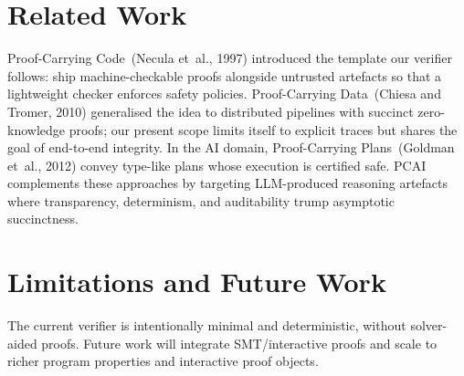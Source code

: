 \documentclass[11pt]{article}
\begin{document}
\section{Related Work}
Proof-Carrying Code~(Necula et~al., 1997) introduced the template our verifier follows: ship machine-checkable proofs alongside untrusted artefacts so that a lightweight checker enforces safety policies. Proof-Carrying Data~(Chiesa and Tromer, 2010) generalised the idea to distributed pipelines with succinct zero-knowledge proofs; our present scope limits itself to explicit traces but shares the goal of end-to-end integrity. In the AI domain, Proof-Carrying Plans~(Goldman et~al., 2012) convey type-like plans whose execution is certified safe. PCAI complements these approaches by targeting LLM-produced reasoning artefacts where transparency, determinism, and auditability trump asymptotic succinctness.

\section{Limitations and Future Work}
The current verifier is intentionally minimal and deterministic, without solver-aided proofs. Future work will integrate SMT/interactive proofs and scale to richer program properties and interactive proof objects.
\end{document}
